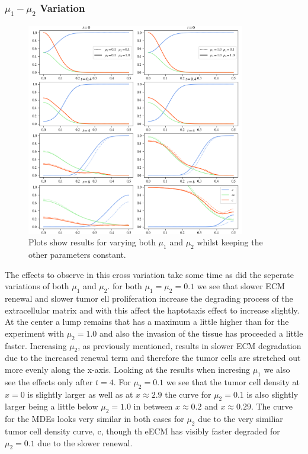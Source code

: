 \subsubsection*{$\mu_1 - \mu_2$ Variation}
\begin{figure}[h]
    \centering
    \includegraphics[width=0.85\textwidth]{resources/images/prolif_mu_1_mu_2_variation.png}
    \caption{Plots show results for varying both $\mu_1$ and $\mu_2$ whilst keeping the other parameters constant.}
    \label{fig:prolif_mu_1_mu_2_variation}
\end{figure}
The effects to observe in this cross variation take some time as did the seperate variations of both $\mu_1$ and $\mu_2$. for both $\mu_1=\mu_2=0.1$ we see that slower ECM renewal and slower tumor ell proliferation increase the degrading process of the extracellular matrix and with this affect the haptotaxis effect to increase slightly. At the center a lump remains that has a maximum a little higher than for the experiment with $\mu_2=1.0$ and also the invasion of the tissue has proceeded a little faster. Increasing $\mu_2$, as previously mentioned, results in slower ECM degradation due to the increased renewal term and therefore the tumor cells are stretched out more evenly along the x-axis. Looking at the results when incresing $\mu_1$ we also see the effects only after $t=4$. For $\mu_2=0.1$ we see that the tumor cell density at $x=0$ is slightly larger as well as at $x\approx 2.9$ the curve for $\mu_2=0.1$ is also slightly larger being a little below $\mu_2=1.0$ in between $x\approx 0.2$ and $x\approx 0.29$. The curve for the MDEs looks very similar in both cases for $\mu_2$ due to the very similiar tumor cell density curve, c, though th eECM has visibly faster degraded for $\mu_2=0.1$ due to the slower renewal.

